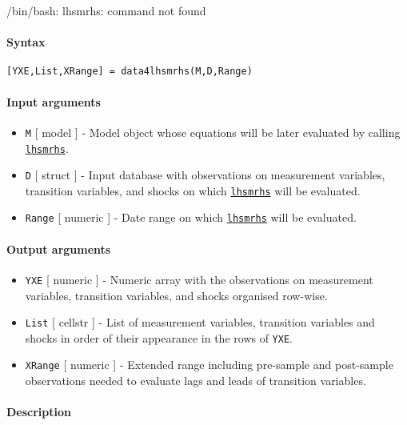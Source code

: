 /bin/bash: lhsmrhs: command not found



	\paragraph{Syntax}

\begin{verbatim}
[YXE,List,XRange] = data4lhsmrhs(M,D,Range)
\end{verbatim}

\paragraph{Input arguments}

\begin{itemize}
\item
  \texttt{M} {[} model {]} - Model object whose equations will be later
  evaluated by calling \href{model/lhsmrhs}{\texttt{lhsmrhs}}.
\item
  \texttt{D} {[} struct {]} - Input database with observations on
  measurement variables, transition variables, and shocks on which
  \href{model/lhsmrhs}{\texttt{lhsmrhs}} will be evaluated.
\item
  \texttt{Range} {[} numeric {]} - Date range on which
  \href{model/lhsmrhs}{\texttt{lhsmrhs}} will be evaluated.
\end{itemize}

\paragraph{Output arguments}

\begin{itemize}
\item
  \texttt{YXE} {[} numeric {]} - Numeric array with the observations on
  measurement variables, transition variables, and shocks organised
  row-wise.
\item
  \texttt{List} {[} cellstr {]} - List of measurement variables,
  transition variables and shocks in order of their appearance in the
  rows of \texttt{YXE}.
\item
  \texttt{XRange} {[} numeric {]} - Extended range including pre-sample
  and post-sample observations needed to evaluate lags and leads of
  transition variables.
\end{itemize}

\paragraph{Description}

